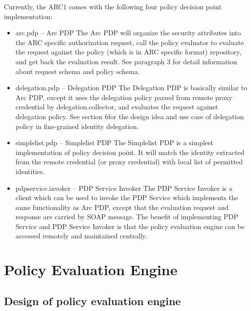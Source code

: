 \documentclass{book}
\begin{document}
Currently, the ARC1 comes with the following four policy decision point implementation:

\begin{itemize}
    \item arc.pdp – Arc PDP
The Arc PDP will organize the security attributes into the ARC specific authorization request, call the policy evaluator to evaluate the request against the policy (which is in ARC specific format) repository, and get back the evaluation result. See paragraph 3 for detail information about request schema and policy schema.

    \item delegation.pdp – Delegation PDP
The Delegation PDP is basically similar to Arc PDP, except it uses the delegation policy parsed from remote proxy credential by delegation.collector, and evaluates the request against delegation policy. See section 6for the design idea and use case of delegation policy in fine-grained identity delegation.

    \item simplelist.pdp – Simplelist PDP
The Simplelist PDP is a simplest implementation of policy decision point. It will match the identity extracted from the remote credential (or proxy credential) with local list of permitted identities.

    \item pdpservice.invoker – PDP Service Invoker
The PDP Service Invoker is a client which can be used to invoke the PDP Service which implements the same functionality as Arc PDP, except that the evaluation request and response are carried by SOAP message. The benefit of implementing PDP Service and PDP Service Invoker is that the policy evaluation engine can be accessed remotely and maintained centrally.

\end{itemize}




\section{Policy Evaluation Engine} %
\label{sec:policy_eval}

\subsection{Design of policy evaluation engine} %
\label{subsec:design_policyengine}
\end{document}
